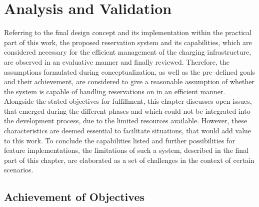 
\chapter{Analysis and Validation}
\label{ch:Analysis and Validation}

Referring to the final design concept and its implementation within the practical part of this work, the proposed reservation system and its capabilities, which are considered necessary for the efficient management of the charging infrastructure, are observed in an evaluative manner and finally reviewed.
Therefore, the assumptions formulated during conceptualization, as well as the pre--defined goals and their achievement, are considered to give a reasonable assumption of whether the system is capable of handling reservations on  in an efficient manner.
Alongside the stated objectives for fulfillment, this chapter discusses open issues, that emerged during the different phases and which could not be integrated into the development process, due to the limited resources available. However, these characteristics are deemed essential to facilitate situations, that would add value to this work.
To conclude the capabilities listed and further possibilities for feature implementations, the limitations of such a system, described in the final part of this chapter, are elaborated as a set of challenges in the context of certain scenarios. 

\section{Achievement of Objectives}
\label{ch:Analysis and Validation:sec:Achievement of Objectives}

